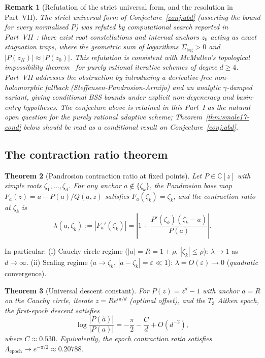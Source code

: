 \documentclass[11pt,a4paper]{article}
\newtheorem{theorem}{Theorem}[section]
\newtheorem{remark}[theorem]{Remark}
\begin{document}
\begin{remark}[Refutation of the strict universal form, and the resolution in Part~VII]\label{rem:conj-status}
The \emph{strict universal} form of Conjecture~\ref{conj:abd} (asserting the bound for \emph{every} normalised $P$) was refuted by computational search reported in Part~VII~\cite{besevic7}: there exist root constellations and internal anchors $z_0$ acting as exact stagnation traps, where the geometric sum of logarithms $\Sigma_{\log} > 0$ and $|P(z_K)| \approx |P(z_0)|$. This refutation is consistent with McMullen's topological impossibility theorem~\cite{mcmullen} for purely rational iterative schemes of degree $d \ge 4$. Part~VII addresses the obstruction by introducing a derivative-free \emph{non-holomorphic fallback} (Steffensen-Pandrosion-Armijo) and an analytic $\gamma$-damped variant, giving conditional BSS bounds under explicit non-degeneracy and basin-entry hypotheses. The conjecture above is retained in this Part~I as the natural open question for the \emph{purely rational} adaptive scheme; Theorem~\ref{thm:smale17-cond} below should be read as a conditional result on Conjecture~\ref{conj:abd}.
\end{remark}

\subsection{The contraction ratio theorem}

\begin{theorem}[Pandrosion contraction ratio at fixed points]\label{thm:contract}
Let $P \in \mathbb{C}[z]$ with simple roots $\zeta_1, \dots, \zeta_d$. For any anchor $a \notin \{\zeta_k\}$, the Pandrosion base map $F_a(z) = a - P(a)/Q(a, z)$ satisfies $F_a(\zeta_k) = \zeta_k$, and the contraction ratio at $\zeta_k$ is
\begin{equation}
\lambda(a, \zeta_k) := |F_a'(\zeta_k)| = \left| 1 + \frac{P'(\zeta_k)(\zeta_k - a)}{P(a)} \right|.
\end{equation}
\end{theorem}

In particular: (i) Cauchy circle regime ($|a| = R = 1 + \rho$, $|\zeta_k| \le \rho$): $\lambda \to 1$ as $d \to \infty$. (ii) Scaling regime ($a \to \zeta_k$, $|a - \zeta_k| = \varepsilon \ll 1$): $\lambda = O(\varepsilon) \to 0$ (\emph{quadratic} convergence).

\begin{theorem}[Universal descent constant]\label{thm:univ-desc}
For $P(z) = z^d - 1$ with anchor $a = R$ on the Cauchy circle, iterate $z = R e^{i\pi/d}$ (optimal offset), and the $T_3$ Aitken epoch, the first-epoch descent satisfies
$$ \log \frac{|P(\hat a)|}{|P(a)|} = -\frac{\pi}{2} - \frac{C}{d} + O(d^{-2}), $$
where $C \approx 0.530$. Equivalently, the epoch contraction ratio satisfies $\Lambda_{\mathrm{epoch}} \to e^{-\pi/2} \approx 0.20788$.
\end{theorem}
\end{document}
